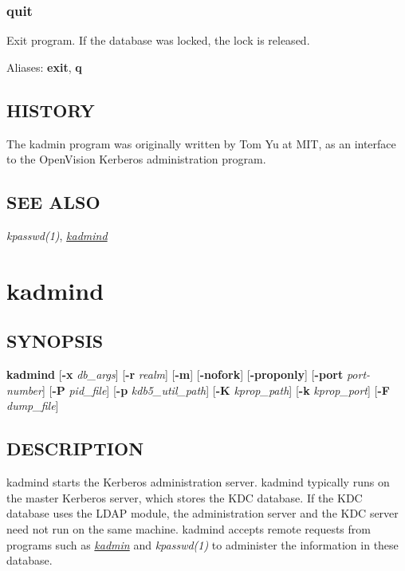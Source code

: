 \documentclass[letterpaper,10pt,english]{sphinxmanual}
\begin{document}
\subsubsection{quit}
\label{admin/admin_commands/kadmin_local:quit}
Exit program.  If the database was locked, the lock is released.

Aliases: \textbf{exit}, \textbf{q}


\subsection{HISTORY}
\label{admin/admin_commands/kadmin_local:history}
The kadmin program was originally written by Tom Yu at MIT, as an
interface to the OpenVision Kerberos administration program.


\subsection{SEE ALSO}
\label{admin/admin_commands/kadmin_local:see-also}
\emph{kpasswd(1)}, {\hyperref[admin/admin_commands/kadmind:kadmind-8]{\emph{kadmind}}}


\section{kadmind}
\label{admin/admin_commands/kadmind:kadmind-8}\label{admin/admin_commands/kadmind:kadmind}\label{admin/admin_commands/kadmind::doc}

\subsection{SYNOPSIS}
\label{admin/admin_commands/kadmind:synopsis}
\textbf{kadmind}
{[}\textbf{-x} \emph{db\_args}{]}
{[}\textbf{-r} \emph{realm}{]}
{[}\textbf{-m}{]}
{[}\textbf{-nofork}{]}
{[}\textbf{-proponly}{]}
{[}\textbf{-port} \emph{port-number}{]}
{[}\textbf{-P} \emph{pid\_file}{]}
{[}\textbf{-p} \emph{kdb5\_util\_path}{]}
{[}\textbf{-K} \emph{kprop\_path}{]}
{[}\textbf{-k} \emph{kprop\_port}{]}
{[}\textbf{-F} \emph{dump\_file}{]}


\subsection{DESCRIPTION}
\label{admin/admin_commands/kadmind:description}
kadmind starts the Kerberos administration server.  kadmind typically
runs on the master Kerberos server, which stores the KDC database.  If
the KDC database uses the LDAP module, the administration server and
the KDC server need not run on the same machine.  kadmind accepts
remote requests from programs such as {\hyperref[admin/admin_commands/kadmin_local:kadmin-1]{\emph{kadmin}}} and
\emph{kpasswd(1)} to administer the information in these database.
\end{document}
